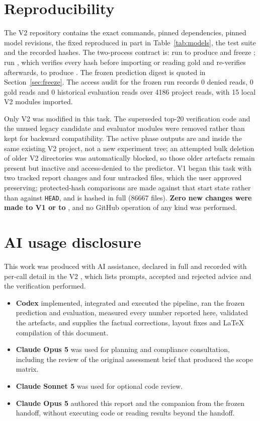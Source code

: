 \documentclass[11pt,a4paper]{article}
\begin{document}
\section{Reproducibility}

The V2 repository contains the exact commands, pinned dependencies, pinned model revisions, the fixed  reproduced in part in Table~\ref{tab:models}, the test suite and the recorded hashes. The two-process contract is: run  to produce and freeze ; run , which verifies every hash before importing or reading gold and re-verifies afterwards, to produce . The frozen prediction digest is quoted in Section~\ref{sec:freeze}. The access audit for the frozen run records 0 denied reads, 0 gold reads and 0 historical evaluation reads over 4186 project reads, with 15 local V2 modules imported.

Only V2 was modified in this task. The superseded top-20 verification code and the unused legacy candidate and evaluator modules were removed rather than kept for backward compatibility. The active phase outputs are  and  inside the same existing V2 project, not a new experiment tree; an attempted bulk deletion of older V2 directories was automatically blocked, so those older artefacts remain present but inactive and access-denied to the predictor. V1 began this task with two tracked report changes and four untracked files, which the user approved preserving; protected-hash comparisons are made against that start state rather than against \texttt{HEAD}, and  is hashed in full (86667 files). \textbf{Zero new changes were made to V1 or to }, and no GitHub operation of any kind was performed.

\section{AI usage disclosure}

This work was produced with AI assistance, declared in full and recorded with per-call detail in the V2 , which lists prompts, accepted and rejected advice and the verification performed.

\begin{itemize}
\item \textbf{Codex} implemented, integrated and executed the pipeline, ran the frozen prediction and evaluation, measured every number reported here, validated the artefacts, and supplies the factual corrections, layout fixes and LaTeX compilation of this document.
\item \textbf{Claude Opus 5} was used for planning and compliance consultation, including the review of the original assessment brief that produced the scope matrix.
\item \textbf{Claude Sonnet 5} was used for optional code review.
\item \textbf{Claude Opus 5} authored this report and the companion from the frozen handoff, without executing code or reading results beyond the handoff.
\end{itemize}
\end{document}
